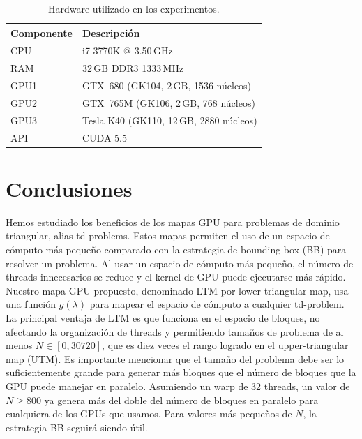 \documentclass[twocolumn,10pt,a4paper]{article}
\begin{document}
\begin{table}[H]
\centering
\caption{Hardware utilizado en los experimentos.}
\label{tab:hardware}
\small
\begin{tabular}{ll}
\toprule
\textbf{Componente} & \textbf{Descripción} \\
\midrule
CPU & i7-3770K @ 3.50\,GHz \\
RAM & 32\,GB DDR3 1333\,MHz \\
GPU1 & GTX~680 (GK104, 2\,GB, 1536 núcleos) \\
GPU2 & GTX~765M (GK106, 2\,GB, 768 núcleos) \\
GPU3 & Tesla K40 (GK110, 12\,GB, 2880 núcleos) \\
API & CUDA 5.5 \\
\bottomrule
\end{tabular}
\end{table}

\section{Conclusiones}
\label{sec:conclusions}

Hemos estudiado los beneficios de los mapas GPU para problemas de dominio
triangular, alias td-problems. Estos mapas permiten el uso de un espacio de
cómputo más pequeño comparado con la estrategia de bounding box (BB) para
resolver un problema. Al usar un espacio de cómputo más pequeño, el número de
threads innecesarios se reduce y el kernel de GPU puede ejecutarse más rápido.
Nuestro mapa GPU propuesto, denominado LTM por lower triangular map, usa una
función $g(\lambda)$ para mapear el espacio de cómputo a cualquier td-problem.
La principal ventaja de LTM es que funciona en el espacio de bloques, no
afectando la organización de threads y permitiendo tamaños de problema de al
menos $N \in [0, 30720]$, que es diez veces el rango logrado en el
upper-triangular map (UTM). Es importante mencionar que el tamaño
del problema debe ser lo suficientemente grande para generar más bloques que el
número de bloques que la GPU puede manejar en paralelo. Asumiendo un warp de 32
threads, un valor de $N \geq 800$ ya genera más del doble del número de bloques
en paralelo para cualquiera de los GPUs que usamos. Para valores más pequeños
de $N$, la estrategia BB seguirá siendo útil.
\end{document}
